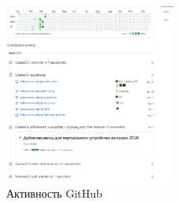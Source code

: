 {  \begin{figure}[h]
    \centering
    \includegraphics[width=0.5\textwidth]{img/activity.png}
    \caption{Активность GitHub}
  \end{figure} 

\par
}


